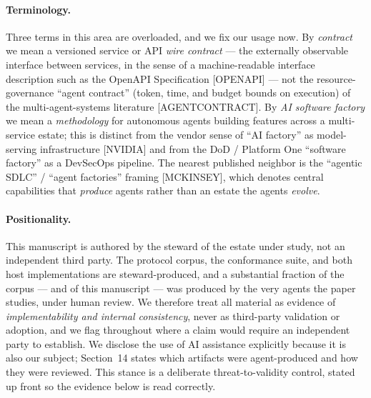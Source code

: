 \documentclass[11pt]{article}
\begin{document}
\paragraph{Terminology.} Three terms in this area are overloaded, and we fix our usage now. By
\emph{contract} we mean a versioned service or API \emph{wire contract} --- the externally observable
interface between services, in the sense of a machine-readable interface description such as the
OpenAPI Specification [OPENAPI] --- not the resource-governance ``agent contract'' (token, time, and budget
bounds on execution) of the multi-agent-systems literature [AGENTCONTRACT]. By \emph{AI software
factory} we mean a \emph{methodology} for autonomous agents building features across a multi-service
estate; this is distinct from the vendor sense of ``AI factory'' as model-serving infrastructure
[NVIDIA] and from the DoD / Platform One ``software factory'' as a DevSecOps pipeline. The nearest
published neighbor is the ``agentic SDLC'' / ``agent factories'' framing [MCKINSEY], which denotes
central capabilities that \emph{produce} agents rather than an estate the agents \emph{evolve}.

\paragraph{Positionality.} This manuscript is authored by the steward of the estate under study, not
an independent third party. The protocol corpus, the conformance suite, and both host implementations
are steward-produced, and a substantial fraction of the corpus --- and of this manuscript --- was
produced by the very agents the paper studies, under human review. We therefore treat all material as
evidence of \emph{implementability and internal consistency}, never as third-party validation or
adoption, and we flag throughout where a claim would require an independent party to establish. We
disclose the use of AI assistance explicitly because it is also our subject; Section~14 states which
artifacts were agent-produced and how they were reviewed. This stance is a deliberate
threat-to-validity control, stated up front so the evidence below is read correctly.
\end{document}
